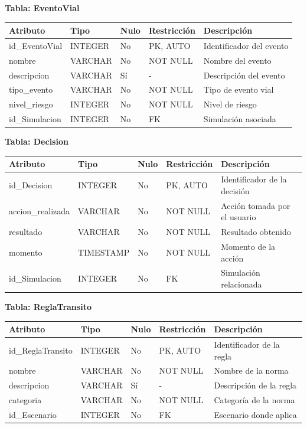 \documentclass[12pt]{article}
\begin{document}
\textbf{Tabla: EventoVial}
\begin{table}[H]
\centering
\begin{tabular}{|p{3cm}|p{2cm}|p{1cm}|p{2cm}|p{5cm}|}
\hline
\textbf{Atributo} & \textbf{Tipo} & \textbf{Nulo} & \textbf{Restricción} & \textbf{Descripción} \\ \hline
id\_EventoVial & INTEGER & No & PK, AUTO & Identificador del evento \\ \hline
nombre & VARCHAR & No & NOT NULL & Nombre del evento \\ \hline
descripcion & VARCHAR & Sí & - & Descripción del evento \\ \hline
tipo\_evento & VARCHAR & No & NOT NULL & Tipo de evento vial \\ \hline
nivel\_riesgo & INTEGER & No & NOT NULL & Nivel de riesgo \\ \hline
id\_Simulacion & INTEGER & No & FK & Simulación asociada \\ \hline
\end{tabular}
\end{table}

\textbf{Tabla: Decision}
\begin{table}[H]
\centering
\begin{tabular}{|p{3cm}|p{2cm}|p{1cm}|p{2cm}|p{5cm}|}
\hline
\textbf{Atributo} & \textbf{Tipo} & \textbf{Nulo} & \textbf{Restricción} & \textbf{Descripción} \\ \hline
id\_Decision & INTEGER & No & PK, AUTO & Identificador de la decisión \\ \hline
accion\_realizada & VARCHAR & No & NOT NULL & Acción tomada por el usuario \\ \hline
resultado & VARCHAR & No & NOT NULL & Resultado obtenido \\ \hline
momento & TIMESTAMP & No & NOT NULL & Momento de la acción \\ \hline
id\_Simulacion & INTEGER & No & FK & Simulación relacionada \\ \hline
\end{tabular}
\end{table}

\textbf{Tabla: ReglaTransito}
\begin{table}[H]
\centering
\begin{tabular}{|p{3cm}|p{2cm}|p{1cm}|p{2cm}|p{5cm}|}
\hline
\textbf{Atributo} & \textbf{Tipo} & \textbf{Nulo} & \textbf{Restricción} & \textbf{Descripción} \\ \hline
id\_ReglaTransito & INTEGER & No & PK, AUTO & Identificador de la regla \\ \hline
nombre & VARCHAR & No & NOT NULL & Nombre de la norma \\ \hline
descripcion & VARCHAR & Sí & - & Descripción de la regla \\ \hline
categoria & VARCHAR & No & NOT NULL & Categoría de la norma \\ \hline
id\_Escenario & INTEGER & No & FK & Escenario donde aplica \\ \hline
\end{tabular}
\end{table}
\end{document}
